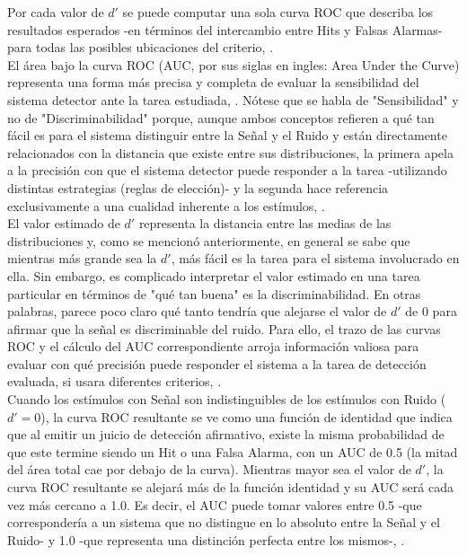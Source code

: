 Por cada valor de $d'$ se puede computar una sola curva ROC que describa los resultados esperados -en términos del intercambio entre Hits y Falsas Alarmas- para todas las posibles ubicaciones del criterio, \parencite{Swets1961, Swets1973, Stainslaw1999}.\\


El área bajo la curva ROC (AUC, por sus siglas en ingles: Area Under the Curve) representa una forma más precisa y completa de evaluar la sensibilidad del sistema detector ante la tarea estudiada, \parencite{Centor1985,  Stainslaw1999, McNicol5}. Nótese que se habla de "Sensibilidad" y no de "Discriminabilidad" porque, aunque ambos conceptos refieren a qué tan fácil es para el sistema distinguir entre la Señal y el Ruido y están directamente relacionados con la distancia que existe entre sus distribuciones, la primera apela a la precisión con que el sistema detector puede responder a la tarea -utilizando distintas estrategias (reglas de elección)- y la segunda hace referencia exclusivamente a una cualidad inherente a los estímulos, \parencite{Swets1973}.\\

El valor estimado de $d'$ representa la distancia entre las medias de las distribuciones y, como se mencionó anteriormente, en general se sabe que mientras más grande sea la $d'$, más fácil es la tarea para el sistema involucrado en ella. Sin embargo, es complicado interpretar el valor estimado en una tarea particular en términos de "qué tan buena" es la discriminabilidad. En otras palabras, parece poco claro qué tanto tendría que alejarse el valor de $d'$ de $0$ para afirmar que la señal es discriminable del ruido. Para ello, el trazo de las curvas ROC y el cálculo del AUC correspondiente arroja información valiosa para evaluar con qué precisión puede responder el sistema a la tarea de detección evaluada, si usara diferentes criterios, \parencite{Stainslaw1999}.\\ 

Cuando los estímulos con Señal son indistinguibles de los estímulos con Ruido ($d' = 0$), la curva ROC resultante se ve como una función de identidad que indica que al emitir un juicio de detección afirmativo, existe la misma probabilidad de que este termine siendo un Hit o una Falsa Alarma, con un AUC de 0.5 (la mitad del área total cae por debajo de la curva). Mientras mayor sea el valor de $d'$, la curva ROC resultante se alejará más de la función identidad y su AUC será cada vez más cercano a 1.0. Es decir, el AUC puede tomar valores entre 0.5 -que correspondería a un sistema que no distingue en lo absoluto entre la Señal y el Ruido- y 1.0 -que representa una distinción perfecta entre los mismos-, \parencite{Swets1973, Stainslaw1999, McNicol5}.\\

